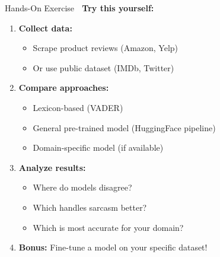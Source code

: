 \documentclass[aspectratio=169]{beamer}
\begin{document}
\begin{frame}[shrink=10]{Hands-On Exercise 🧪}
    \textbf{Try this yourself:}

    \begin{enumerate}\setlength{\itemsep}{0pt}
        \item \textbf{Collect data:}
        \begin{itemize}\setlength{\itemsep}{0pt}
            \item Scrape product reviews (Amazon, Yelp)
            \item Or use public dataset (IMDb, Twitter)
        \end{itemize}

        \item \textbf{Compare approaches:}
        \begin{itemize}\setlength{\itemsep}{0pt}
            \item Lexicon-based (VADER)
            \item General pre-trained model (HuggingFace pipeline)
            \item Domain-specific model (if available)
        \end{itemize}

        \item \textbf{Analyze results:}
        \begin{itemize}\setlength{\itemsep}{0pt}
            \item Where do models disagree?
            \item Which handles sarcasm better?
            \item Which is most accurate for your domain?
        \end{itemize}

        \item \textbf{Bonus:} Fine-tune a model on your specific dataset!
    \end{enumerate}
\end{frame}
\end{document}
